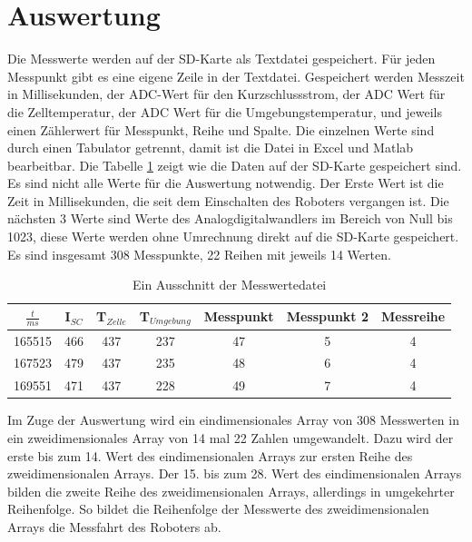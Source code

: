\documentclass[a4paper,bibtotoc,oneside]{scrbook}
\begin{document}
\section{Auswertung}\thispagestyle{empty}

Die Messwerte werden auf der SD-Karte als Textdatei gespeichert. Für jeden Messpunkt gibt es eine eigene Zeile in der Textdatei. Gespeichert werden Messzeit in Millisekunden, der ADC-Wert für den Kurzschlussstrom, der ADC Wert für die Zelltemperatur, der ADC Wert für die Umgebungstemperatur, und jeweils einen Zählerwert für Messpunkt, Reihe und Spalte. Die einzelnen Werte sind durch einen Tabulator getrennt, damit ist die Datei in Excel und Matlab bearbeitbar.  
Die Tabelle \ref{TabSD} zeigt wie die Daten auf der SD-Karte gespeichert sind. Es sind nicht alle Werte für die Auswertung notwendig. Der Erste Wert ist die Zeit in Millisekunden, die seit dem Einschalten des Roboters vergangen ist. Die nächsten 3 Werte sind Werte des Analogdigitalwandlers im Bereich von Null bis 1023, diese Werte werden ohne Umrechnung direkt auf die SD-Karte gespeichert. Es sind insgesamt 308 Messpunkte, 22 Reihen mit jeweils 14 Werten.  

 
\begin{table}[htbp]
\centering
\begin{tabular}{ | c | c | c | c | c | c | c | } 
\hline
$\frac{t}{ms}$ & I$_{SC}$ & T$_{Zelle}$ & T$_{Umgebung}$ & Messpunkt & Messpunkt 2 & Messreihe \\
\hline
\hline
{165515} & {466} & {437} & {237} & {47} & {5} & {4} \\
\hline
{167523} & {479} & {437} & {235} & {48} & {6} & {4} \\
\hline
{169551} & {471} & {437} & {228} & {49} & {7} & {4} \\
\hline
\end{tabular}
\caption{Ein Ausschnitt der Messwertedatei}\label{TabSD}
\end{table}

Im Zuge der Auswertung wird ein eindimensionales Array von 308 Messwerten in ein zweidimensionales Array von 14 mal 22 Zahlen umgewandelt. Dazu wird der erste bis zum 14. Wert des eindimensionalen Arrays zur ersten Reihe des zweidimensionalen Arrays. Der 15. bis zum 28. Wert des eindimensionalen Arrays bilden die zweite Reihe des zweidimensionalen Arrays, allerdings in umgekehrter Reihenfolge. So bildet die Reihenfolge der Messwerte des zweidimensionalen Arrays die Messfahrt des Roboters ab.
\newline
\end{document}

